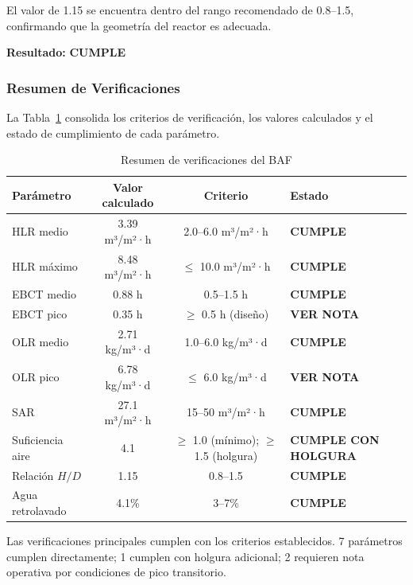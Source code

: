 \documentclass[12pt,a4paper]{article}
\begin{document}
El valor de 1.15 se encuentra dentro del rango recomendado de 0.8--1.5, confirmando que la geometría del reactor es adecuada.

\textbf{Resultado:} \textbf{CUMPLE}

\subsubsection*{Resumen de Verificaciones}

La Tabla~\ref{tab:verif_baf} consolida los criterios de verificación, los valores calculados y el estado de cumplimiento de cada parámetro.

\begin{table}[H]
\centering
\caption{Resumen de verificaciones del BAF}
\label{tab:verif_baf}
\begin{tabular}{lccl}
\toprule
\textbf{Parámetro} & \textbf{Valor calculado} & \textbf{Criterio} & \textbf{Estado} \\
\midrule
HLR medio        & 3.39 m³/m²·h   & 2.0--6.0 m³/m²·h  & \textbf{CUMPLE} \\
HLR máximo       & 8.48 m³/m²·h   & $\leq$ 10.0 m³/m²·h             & \textbf{CUMPLE} \\
EBCT medio       & 0.88 h                   & 0.5--1.5 h                   & \textbf{CUMPLE} \\
EBCT pico        & 0.35 h              & $\geq$ 0.5 h (diseño)             & \textbf{VER NOTA} \\
OLR medio        & 2.71 kg/m³·d   & 1.0--6.0 kg/m³·d & \textbf{CUMPLE} \\
OLR pico         & 6.78 kg/m³·d & $\leq$ 6.0 kg/m³·d          & \textbf{VER NOTA} \\
SAR              & 27.1 m³/m²·h       & 15--50 m³/m²·h  & \textbf{CUMPLE} \\
Suficiencia aire & 4.1      & $\geq$ 1.0 (mínimo); $\geq$ 1.5 (holgura)  & \textbf{CUMPLE CON HOLGURA} \\
Relación $H/D$   & 1.15               & 0.8--1.5          & \textbf{CUMPLE} \\
Agua retrolavado & 4.1\%          & 3--7\%  & \textbf{CUMPLE} \\
\bottomrule
\end{tabular}
\end{table}

Las verificaciones principales cumplen con los criterios establecidos. 7 parámetros cumplen directamente; 1 cumplen con holgura adicional; 2 requieren nota operativa por condiciones de pico transitorio.
\end{document}
